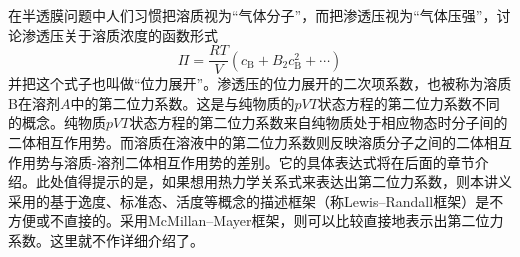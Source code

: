 \documentclass[main.tex]{subfiles}
\begin{document}
在半透膜问题中人们习惯把溶质视为“气体分子”，而把渗透压视为“气体压强”，讨论渗透压关于溶质浓度的函数形式
\[\Pi=\frac{RT}{V}\left(c_\text{B}+B_2c_\text{B}^2+\cdots\right)\]
并把这个式子也叫做“位力展开”。渗透压的位力展开的二次项系数，也被称为溶质B在溶剂$A$中的第二位力系数。这是与纯物质的$pVT$状态方程的第二位力系数不同的概念。纯物质$pVT$状态方程的第二位力系数来自纯物质处于相应物态时分子间的二体相互作用势。而溶质在溶液中的第二位力系数则反映溶质分子之间的二体相互作用势与溶质-溶剂二体相互作用势的差别。它的具体表达式将在后面的章节介绍。此处值得提示的是，如果想用热力学关系式来表达出第二位力系数，则本讲义采用的基于逸度、标准态、活度等概念的描述框架（称Lewis--Randall框架）是不方便或不直接的。采用McMillan--Mayer框架，则可以比较直接地表示出第二位力系数\cite{Mollerup2009}。这里就不作详细介绍了。
\end{document}
